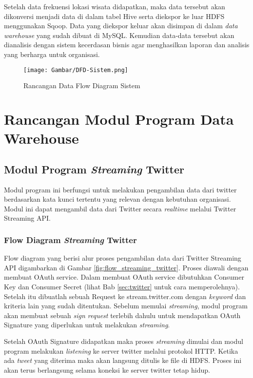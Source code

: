 Setelah data frekuensi lokasi wisata didapatkan, maka data tersebut akan dikonversi menjadi data di dalam tabel Hive serta diekspor ke luar HDFS menggunakan Sqoop. Data yang diekspor keluar akan disimpan di dalam \textit{data warehouse} yang sudah dibuat di MySQL. Kemudian data-data tersebut akan dianalisis dengan sistem kecerdasan bisnis agar menghasilkan laporan dan analisis yang berharga untuk organisasi.

\begin{figure}[H]
	\centering
	\texttt{[image: Gambar/DFD-Sistem.png]}
	\caption[Rancangan Data Flow Diagram Sistem]{Rancangan Data Flow Diagram Sistem} 
	\label{fig:rancangan_dfd}
\end{figure}

\section{Rancangan Modul Program Data Warehouse}
\subsection{Modul Program \textit{Streaming} Twitter}
Modul program ini berfungsi untuk melakukan pengambilan data dari twitter berdasarkan kata kunci tertentu yang relevan dengan kebutuhan organisasi. Modul ini dapat mengambil data dari Twitter secara \textit{realtime} melalui Twitter Streaming API. 

\subsubsection{Flow Diagram \textit{Streaming} Twitter}
Flow diagram yang berisi alur proses pengambilan data dari Twitter Streaming API digambarkan di Gambar \ref{fig:flow_streaming_twitter}. Proses diawali dengan membuat OAuth service. Dalam membuat OAuth service dibutuhkan Consumer Key dan Consumer Secret (lihat Bab \ref{sec:twitter} untuk cara memperolehnya). Setelah itu dibuatlah sebuah Request ke stream.twitter.com dengan \textit{keyword} dan kriteria lain yang sudah ditentukan. Sebelum memulai \textit{streaming}, modul program akan membuat sebuah \textit{sign request} terlebih dahulu untuk mendapatkan OAuth Signature yang diperlukan untuk melakukan \textit{streaming}. 

Setelah OAuth Signature didapatkan maka proses \textit{streaming} dimulai dan modul program melakukan \textit{listening} ke server twitter melalui protokol HTTP. Ketika ada \textit{tweet} yang diterima maka akan langsung ditulis ke file di HDFS. Proses ini akan terus berlangsung selama koneksi ke server twitter tetap hidup.
 
